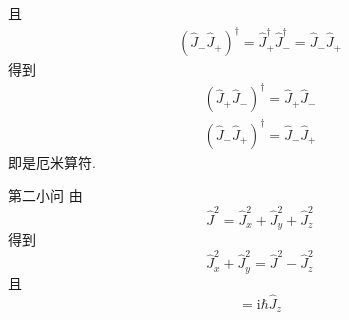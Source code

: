 且
\begin{equation}
    \begin{aligned}
        \left( \hat{J}_-\hat{J}_+ \right) ^{\dagger}=\hat{J}_{+}^{\dagger}\hat{J}_{-}^{\dagger}=\hat{J}_-\hat{J}_+
    \end{aligned}
\end{equation}
得到
\begin{equation}
    \begin{aligned}
        \left( \hat{J}_+\hat{J}_- \right) ^{\dagger}=\hat{J}_+\hat{J}_-
\\
\left( \hat{J}_-\hat{J}_+ \right) ^{\dagger}=\hat{J}_-\hat{J}_+
    \end{aligned}
\end{equation}
即是厄米算符.

第二小问
由
\begin{equation}
    \hat{J}^2=\hat{J}_{x}^{2}+\hat{J}_{y}^{2}+\hat{J}_{z}^{2}
\end{equation}
得到
\begin{equation}
    \hat{J}_{x}^{2}+\hat{J}_{y}^{2}=\hat{J}^2-\hat{J}_{z}^{2}
\end{equation}
且
\begin{equation}
    [\hat{J}_x,\hat{J}_y]=\mathrm{i}\hbar \hat{J}_z
\end{equation}

